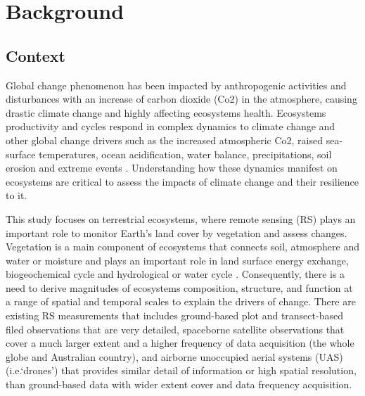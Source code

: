 \chapter{Background}\label{cha:introduction}

\section{Context}
Global change phenomenon has been impacted by anthropogenic activities and disturbances with an
increase of carbon dioxide (Co2) in the atmosphere, causing drastic climate change and highly
affecting ecosystems health. Ecosystems productivity and cycles respond in complex dynamics to
climate change and other global change drivers such as the increased atmospheric Co2, raised sea-
surface temperatures, ocean acidification, water balance, precipitations, soil erosion and extreme
events \citep{malhiClimateChangeEcosystems2020, dronovaRemoteSensingPhenology2022}. 
Understanding how these dynamics manifest on ecosystems are critical to assess the impacts of
climate change and their resilience to it.

This study focuses on terrestrial ecosystems, where remote sensing (RS) plays an important role to
monitor Earth’s land cover by vegetation and assess changes. Vegetation is a main component of
ecosystems that connects soil, atmosphere and water or moisture and plays an important role in land
surface energy exchange, biogeochemical cycle and hydrological or water cycle 
\citep{zhangFractionalVegetationCover2019, liangChapter12Fractional2020}.
Consequently, there is a need to derive magnitudes of ecosystems composition, structure, and function at
a range of spatial and temporal scales to explain the drivers of change. There are existing RS measurements
that includes ground-based plot and transect-based filed observations that are very detailed, spaceborne
satellite observations that cover a much larger extent and a higher frequency of data acquisition (the whole
globe and Australian country), and airborne unoccupied aerial systems (UAS) (i.e.‘drones’) that provides
similar detail of information or high spatial resolution, than ground-based data with wider extent cover
and data frequency acquisition.

